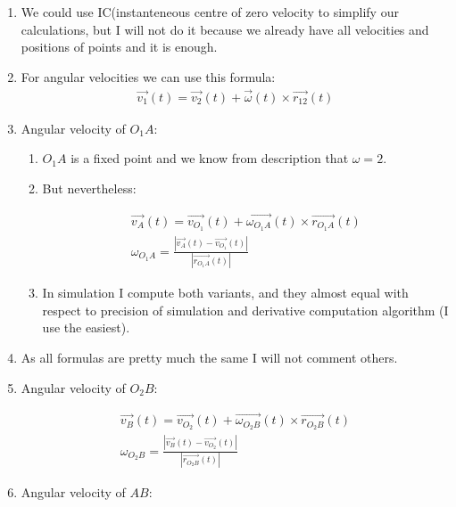 \begin{enumerate}
    \item We could use IC(instanteneous centre of zero velocity to simplify our calculations,
          but I will not do it because we already have all velocities and positions of points and it is enough.
    \item For angular velocities we can use this formula:
          \begin{align}
              \vec{v_1}(t) = \vec{v_2}(t) + \vec{\omega}(t) \times \vec{r_{12}}(t)
          \end{align}
    \item Angular velocity of $O_1A$:
          \begin{enumerate}
              \item $O_1A$ is a fixed point and we know from description that $\omega = 2$.
              \item But nevertheless:
                    \begin{answer}

                        \begin{align}
                            \vec{v_A}(t) = \vec{v_{O_1}}(t) + \vec{\omega_{O_1A}}(t) \times \vec{r_{O_1A}}(t) \\
                            \omega_{O_1A} = \frac{|\vec{v_A}(t) - \vec{v_{O_1}}(t)|}{|\vec{r_{O_1A}}(t)|}
                        \end{align}
                    \end{answer}
              \item In simulation I compute both variants, and they almost equal
                    with respect to precision of simulation and derivative computation algorithm (I use the easiest).
          \end{enumerate}
    \item As all formulas are pretty much the same I will not comment others.
    \item Angular velocity of $O_2B$:
          \begin{answer}
              \begin{align}
                  \vec{v_B}(t) = \vec{v_{O_2}}(t) + \vec{\omega_{O_2B}}(t) \times \vec{r_{O_2B}}(t) \\
                  \omega_{O_2B} = \frac{|\vec{v_B}(t) - \vec{v_{O_2}}(t)|}{|\vec{r_{O_2B}}(t)|}
              \end{align}
          \end{answer}
    \item Angular velocity of $AB$:
          \begin{answer}


\end{answer}
\end{enumerate}
